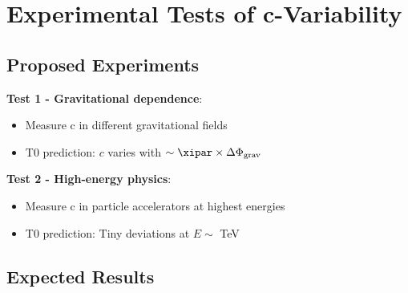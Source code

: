 	\section{Experimental Tests of c-Variability}
	
	\subsection{Proposed Experiments}
	
	\textbf{Test 1 - Gravitational dependence}:
	\begin{itemize}
		\item Measure c in different gravitational fields
		\item T0 prediction: $c$ varies with $\sim \xipar \times \Delta\Phi_{\text{grav}}$
	\end{itemize}

	\textbf{Test 2 - High-energy physics}:
	\begin{itemize}
		\item Measure c in particle accelerators at highest energies
		\item T0 prediction: Tiny deviations at $E \sim$ TeV
	\end{itemize}
	
	\subsection{Expected Results}
	
	\begin{table}[htbp]
		\centering
		\caption{Predicted c-variations}
	\end{table}
	
